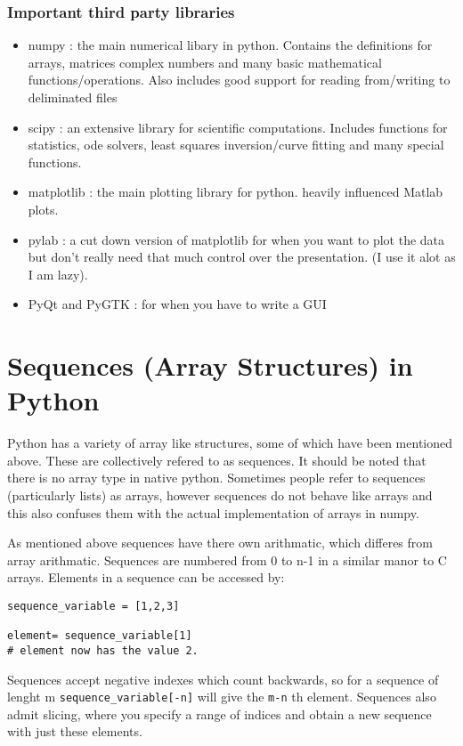 \documentclass[11pt,a4paper]{article}
\begin{document}
\subsubsection{Important third party libraries}
\begin{itemize}
\item numpy : the main numerical libary in python. Contains the definitions for arrays, matrices complex numbers and many basic mathematical functions/operations. Also includes good support for reading from/writing to deliminated files
\item scipy : an extensive library for scientific computations. Includes functions for statistics, ode solvers, least squares inversion/curve fitting and many special functions.
\item matplotlib : the main plotting library for python. heavily influenced Matlab plots.
\item pylab : a cut down version of matplotlib for when you want to plot the data but don't really need that much control over the presentation. (I use it alot as I am lazy).
\item PyQt and PyGTK : for when you have to write a GUI
\end{itemize}

\section{Sequences (Array Structures) in Python} \label{sequences}

Python has a variety of array like structures, some of which have been mentioned above. These are collectively refered to as sequences. It should be noted that there is no array type in native python. Sometimes people refer to sequences (particularly lists) as arrays, however sequences do not behave like arrays and this also confuses them with the actual implementation of arrays in numpy.

As mentioned above sequences have there own arithmatic, which differes from array arithmatic. Sequences are numbered from 0 to n-1 in a similar manor to C arrays. Elements in a sequence can be accessed by:

\begin{verbatim}
sequence_variable = [1,2,3]

element= sequence_variable[1]
# element now has the value 2.
\end{verbatim}

Sequences accept negative indexes which count backwards, so for a sequence of lenght m \verb|sequence_variable[-n]| will give the \verb|m-n| th element. Sequences also admit slicing, where you specify a range of indices and obtain a new sequence with just these elements.
\end{document}
